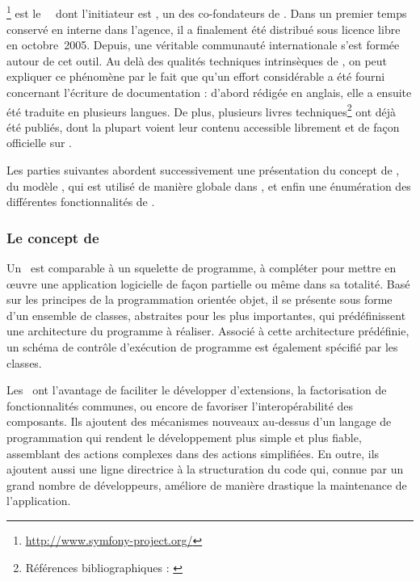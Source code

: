 \subsection{\asf}

\asf\footnote{\url{http://www.symfony-project.org/}} est le \afm\ \aphp\ dont l'initiateur est \apotencier, un des co-fondateurs de \asl. Dans un premier temps conservé en interne dans l'agence, il a finalement été distribué sous licence libre en octobre~2005. Depuis, une véritable communauté internationale s'est formée autour de cet outil. Au delà des qualités techniques intrinsèques de \asf, on peut expliquer ce phénomène par le fait que qu'un effort considérable a été fourni concernant l'écriture de documentation : d'abord rédigée en anglais, elle a ensuite été traduite en plusieurs langues. De plus, plusieurs livres techniques\footnote{Références bibliographiques : \cite{practicalsf} \cite{sfrefguide} \cite{cahierssf} \cite{moresf} \cite{thebook}} ont déjà été publiés, dont la plupart voient leur contenu accessible librement et de façon officielle sur \ainternet.

Les parties suivantes abordent successivement une présentation du concept de \afm, du modèle \amvc, qui est utilisé de manière globale dans \asf, et enfin une énumération des différentes fonctionnalités de \asf.


\subsubsection{Le concept de \afm}

Un \afm\ est comparable à un squelette de programme, à compléter pour mettre en œuvre une application logicielle de façon partielle ou même dans sa totalité. Basé sur les principes de la programmation orientée objet, il se présente sous forme d'un ensemble de classes, abstraites pour les plus importantes, qui prédéfinissent une architecture du programme à réaliser. Associé à cette architecture prédéfinie, un schéma de contrôle d'exécution de programme est également spécifié par les classes.

Les \afms\ ont l'avantage de faciliter le développer d'extensions, la factorisation de fonctionnalités communes, ou encore de favoriser l'interopérabilité des composants. Ils ajoutent des mécanismes nouveaux au-dessus d'un langage de programmation qui rendent le développement plus simple et plus fiable, assemblant des actions complexes dans des actions simplifiées. En outre, ils ajoutent aussi une ligne directrice à la structuration du code qui, connue par un grand nombre de développeurs, améliore de manière drastique la maintenance de l'application.

